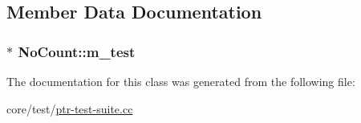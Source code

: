 \subsection{Member Data Documentation}
\subsubsection[{\texorpdfstring{m\+\_\+test}{m_test}}]{$\ast$ No\+Count\+::m\+\_\+test\hspace{0.3cm}{\ttfamily [private]}}\hypertarget{classNoCount_ab739a3cdd4f183297160c126151050a9}{}\label{classNoCount_ab739a3cdd4f183297160c126151050a9}


The documentation for this class was generated from the following file\+:\begin{DoxyCompactItemize}
\item 
core/test/\hyperlink{ptr-test-suite_8cc}{ptr-\/test-\/suite.\+cc}\end{DoxyCompactItemize}
